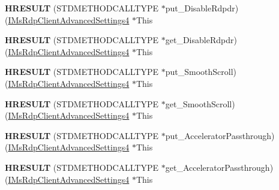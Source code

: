 \begin{DoxyCompactItemize}
{\bfseries H\+R\+E\+S\+U\+LT} (S\+T\+D\+M\+E\+T\+H\+O\+D\+C\+A\+L\+L\+T\+Y\+PE $\ast$put\+\_\+\+Disable\+Rdpdr)(\hyperlink{interface_m_s_t_s_c_lib_1_1_i_ms_rdp_client_advanced_settings4}{I\+Ms\+Rdp\+Client\+Advanced\+Settings4} $\ast$This
\item 
\mbox{\label{struct_m_s_t_s_c_lib_1_1_i_ms_rdp_client_advanced_settings4_vtbl_a6cd56b0653df55db04a6d0f8d8ef186f}} 
{\bfseries H\+R\+E\+S\+U\+LT} (S\+T\+D\+M\+E\+T\+H\+O\+D\+C\+A\+L\+L\+T\+Y\+PE $\ast$get\+\_\+\+Disable\+Rdpdr)(\hyperlink{interface_m_s_t_s_c_lib_1_1_i_ms_rdp_client_advanced_settings4}{I\+Ms\+Rdp\+Client\+Advanced\+Settings4} $\ast$This
\item 
\mbox{\label{struct_m_s_t_s_c_lib_1_1_i_ms_rdp_client_advanced_settings4_vtbl_adeb8ff2facc4bd8a6ae738893b504788}} 
{\bfseries H\+R\+E\+S\+U\+LT} (S\+T\+D\+M\+E\+T\+H\+O\+D\+C\+A\+L\+L\+T\+Y\+PE $\ast$put\+\_\+\+Smooth\+Scroll)(\hyperlink{interface_m_s_t_s_c_lib_1_1_i_ms_rdp_client_advanced_settings4}{I\+Ms\+Rdp\+Client\+Advanced\+Settings4} $\ast$This
\item 
\mbox{\label{struct_m_s_t_s_c_lib_1_1_i_ms_rdp_client_advanced_settings4_vtbl_a127ea9540302a658c1fb89f99ae9f868}} 
{\bfseries H\+R\+E\+S\+U\+LT} (S\+T\+D\+M\+E\+T\+H\+O\+D\+C\+A\+L\+L\+T\+Y\+PE $\ast$get\+\_\+\+Smooth\+Scroll)(\hyperlink{interface_m_s_t_s_c_lib_1_1_i_ms_rdp_client_advanced_settings4}{I\+Ms\+Rdp\+Client\+Advanced\+Settings4} $\ast$This
\item 
\mbox{\label{struct_m_s_t_s_c_lib_1_1_i_ms_rdp_client_advanced_settings4_vtbl_ad9c6f471fb7c2855a55b9d9cc9bfc3f5}} 
{\bfseries H\+R\+E\+S\+U\+LT} (S\+T\+D\+M\+E\+T\+H\+O\+D\+C\+A\+L\+L\+T\+Y\+PE $\ast$put\+\_\+\+Accelerator\+Passthrough)(\hyperlink{interface_m_s_t_s_c_lib_1_1_i_ms_rdp_client_advanced_settings4}{I\+Ms\+Rdp\+Client\+Advanced\+Settings4} $\ast$This
\item 
\mbox{\label{struct_m_s_t_s_c_lib_1_1_i_ms_rdp_client_advanced_settings4_vtbl_a5120b6eceef83503108fcb70779293f2}} 
{\bfseries H\+R\+E\+S\+U\+LT} (S\+T\+D\+M\+E\+T\+H\+O\+D\+C\+A\+L\+L\+T\+Y\+PE $\ast$get\+\_\+\+Accelerator\+Passthrough)(\hyperlink{interface_m_s_t_s_c_lib_1_1_i_ms_rdp_client_advanced_settings4}{I\+Ms\+Rdp\+Client\+Advanced\+Settings4} $\ast$This

\end{DoxyCompactItemize}
